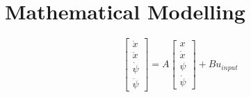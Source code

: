 

\section{Mathematical Modelling}
$$
\begin{bmatrix}
    \dot{x} \\
    \ddot{x} \\
    \dot{\psi} \\
    \ddot{\psi}
\end{bmatrix}
= A
\begin{bmatrix}
    x \\
    \dot{x} \\
    \psi \\
    \dot{\psi}
\end{bmatrix}
+ B u_{input}
$$
